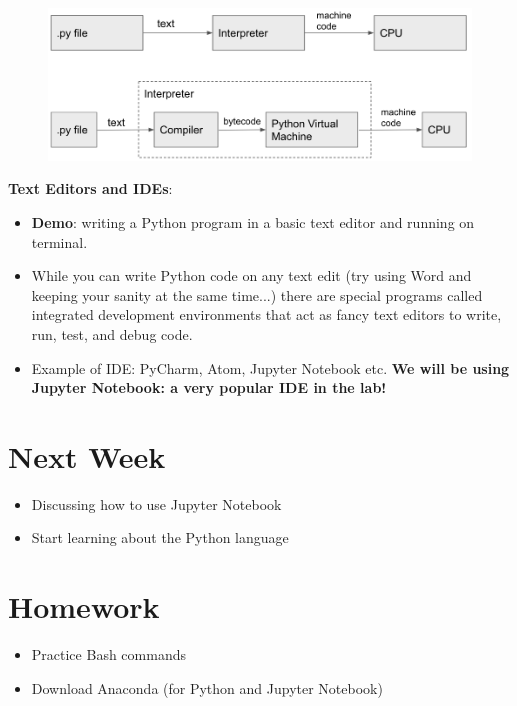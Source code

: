 \documentclass[12pt]{article}
\numberwithin{equation}{section}
\begin{document}
\begin{figure}[H]
	\centering
	\includegraphics[width=13cm] {py}
\end{figure}

\textbf{Text Editors and IDEs}:
\begin{itemize}
    \item \textbf{Demo}: writing a Python program in a basic text editor and running on terminal.
    \item While you can write Python code on any text edit (try using Word and keeping your sanity at the same time...) there are special programs called integrated development environments that act as fancy text editors to write, run, test, and debug code.
    \item Example of IDE: PyCharm, Atom, Jupyter Notebook etc. \textbf{We will be using Jupyter Notebook: a very popular IDE in the lab!}
\end{itemize}

\section{Next Week}
\begin{itemize}
    \item Discussing how to use Jupyter Notebook
    \item Start learning about the Python language
\end{itemize}


\section{Homework}
\begin{itemize}
    \item Practice Bash commands
    \item Download Anaconda (for Python and Jupyter Notebook)
\end{itemize}
\end{document}

